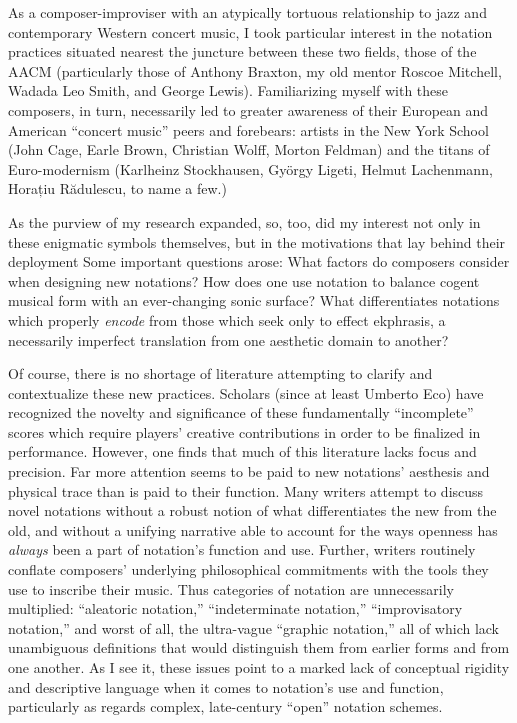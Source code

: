 As a composer-improviser with an atypically tortuous relationship to jazz and contemporary Western concert music, I took particular interest in the notation practices situated nearest the juncture between these two fields, those of the AACM (particularly those of Anthony Braxton, my old mentor Roscoe Mitchell, Wadada Leo Smith, and George Lewis). 
Familiarizing myself with these composers, in turn, necessarily led to greater awareness of their European and American ``concert music'' peers and forebears: artists in the New York School (John Cage, Earle Brown, Christian Wolff, Morton Feldman) and the titans of Euro-modernism (Karlheinz Stockhausen, Gy\"orgy Ligeti, Helmut Lachenmann, Horațiu R\u{a}dulescu, to name a few.)

As the purview of my research expanded, so, too, did my interest not only in these enigmatic symbols themselves, but in the motivations that lay behind their deployment
Some important questions arose: What factors do composers consider when designing new notations?
How does one use notation to balance cogent musical form with an ever-changing sonic surface?
What differentiates notations which properly \textit{encode} from those which seek only to effect ekphrasis, a necessarily imperfect translation from one aesthetic domain to another? 

Of course, there is no shortage of literature attempting to clarify and contextualize these new practices. 
Scholars (since at least Umberto Eco) have recognized the novelty and significance of these fundamentally ``incomplete'' scores which require players' creative contributions in order to be finalized in performance. 
However, one finds that much of this literature lacks focus and precision. 
Far more attention seems to be paid to new notations' aesthesis and physical trace than is paid to their function.
Many writers attempt to discuss novel notations without a robust notion of what differentiates the new from the old, and without a unifying narrative able to account for the ways openness has \emph{always} been a part of notation's function and use.
Further, writers routinely conflate composers' underlying philosophical commitments with the tools they use to inscribe their music.
Thus categories of notation are unnecessarily multiplied: ``aleatoric notation,'' ``indeterminate notation,'' ``improvisatory notation,'' and worst of all, the ultra-vague ``graphic notation,'' all of which lack unambiguous definitions that would distinguish them from earlier forms and from one another. 
As I see it, these issues point to a marked lack of conceptual rigidity and descriptive language when it comes to notation's use and function, particularly as regards complex, late-century ``open'' notation schemes. 
    
